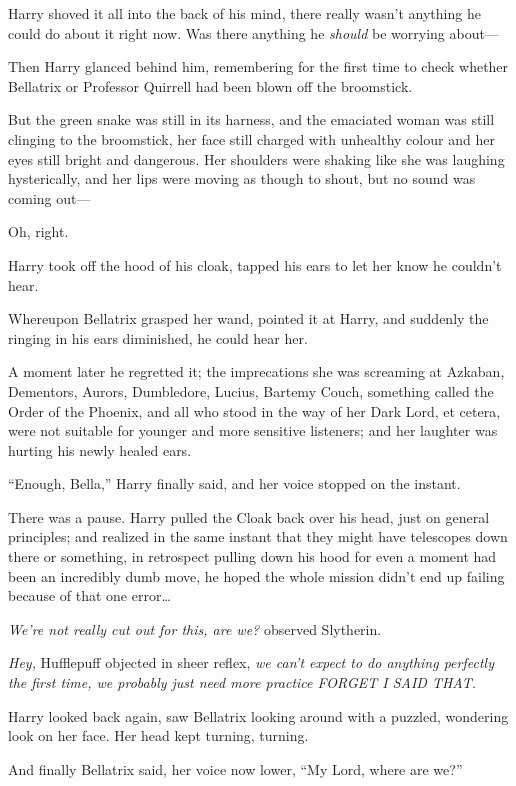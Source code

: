 Harry shoved it all into the back of his mind, there really wasn’t anything he
could do about it right now. Was there anything he \emph{should} be worrying
about—

Then Harry glanced behind him, remembering for the first time to check whether
Bellatrix or Professor Quirrell had been blown off the broomstick.

But the green snake was still in its harness, and the emaciated woman was still
clinging to the broomstick, her face still charged with unhealthy colour and her
eyes still bright and dangerous. Her shoulders were shaking like she was
laughing hysterically, and her lips were moving as though to shout, but no
sound was coming out—

Oh, right.

Harry took off the hood of his cloak, tapped his ears to let her know he
couldn’t hear.

Whereupon Bellatrix grasped her wand, pointed it at Harry, and suddenly the
ringing in his ears diminished, he could hear her.

A moment later he regretted it; the imprecations she was screaming at Azkaban,
Dementors, Aurors, Dumbledore, Lucius, Bartemy Couch, something called the
Order of the Phoenix, and all who stood in the way of her Dark Lord, et cetera,
were not suitable for younger and more sensitive listeners; and her laughter
was hurting his newly healed ears.

“Enough, Bella,” Harry finally said, and her voice stopped on the instant.

There was a pause. Harry pulled the Cloak back over his head, just on general
principles; and realized in the same instant that they might have telescopes
down there or something, in retrospect pulling down his hood for even a moment
had been an incredibly dumb move, he hoped the whole mission didn’t end up
failing because of that one error…

\emph{We’re not really cut out for this, are we?} observed Slytherin.

\emph{Hey,} Hufflepuff objected in sheer reflex, \emph{we can’t expect to do
anything perfectly the first time, we probably just need more practice FORGET I
SAID THAT.}

Harry looked back again, saw Bellatrix looking around with a puzzled, wondering
look on her face. Her head kept turning, turning.

And finally Bellatrix said, her voice now lower, “My Lord, where are we?”

